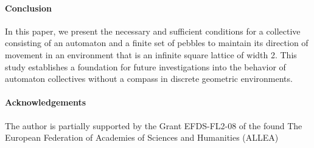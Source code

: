 \documentclass{article}
\begin{document}
\paragraph{Conclusion}
In this paper, we present the necessary and sufficient conditions for a collective consisting of an automaton and a finite set of pebbles to maintain its direction of movement in an environment that is an infinite square lattice of width 2.
This study establishes a foundation for future investigations into the behavior of automaton collectives without a compass in discrete geometric environments.

\paragraph{Acknowledgements}
The author is partially supported by the Grant EFDS-FL2-08 of the found The European Federation of Academies of Sciences and Humanities (ALLEA)


  
\end{document}
